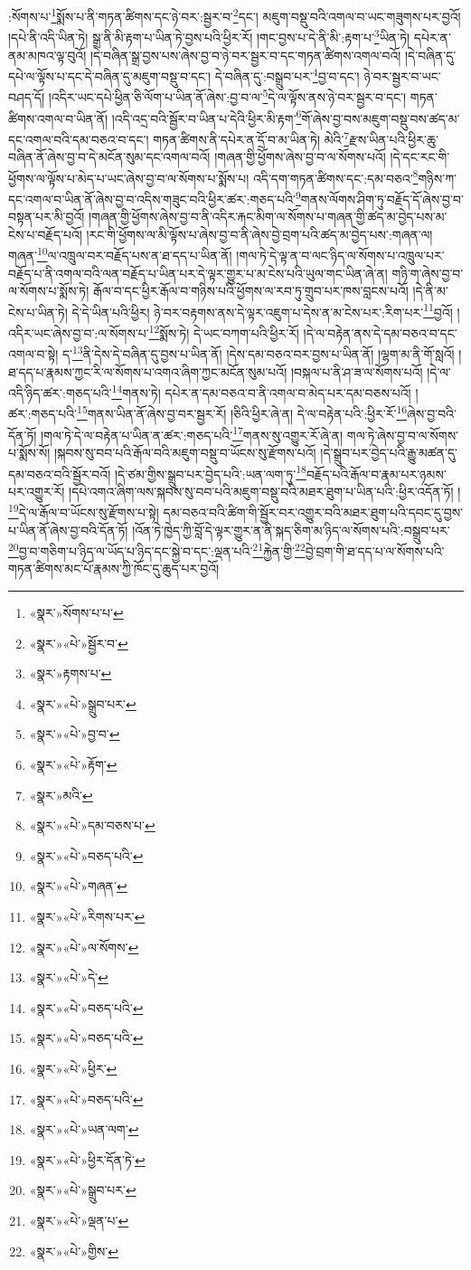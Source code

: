 :སོགས་པ་\footnote{«སྣར་»སོགས་པ་པ་}སྨོས་པ་ནི་གཏན་ཚིགས་དང་ཉེ་བར་:སྦྱར་བ་\footnote{«སྣར་»«པེ་»སྦྱོར་བ་}དང་། མཇུག་བསྡུ་བའི་འགལ་བ་ཡང་གཟུགས་པར་བྱའོ། །དཔེ་ནི་འདི་ཡིན་ཏེ། སྒྲ་ནི་མི་རྟག་པ་ཡིན་ཏེ་བྱས་པའི་ཕྱིར་རོ། །གང་བྱས་པ་དེ་ནི་མི་:རྟག་པ་\footnote{«སྣར་»རྟགས་པ་}ཡིན་ཏེ། དཔེར་ན་ནམ་མཁའ་ལྟ་བུའོ། །དེ་བཞིན་སྒྲ་བྱས་པས་ཞེས་བྱ་བ་ཉེ་བར་སྦྱར་བ་དང་གཏན་ཚིགས་འགལ་བའོ། །དེ་བཞིན་དུ་དཔེ་ལ་ལྟོས་པ་དང་དེ་བཞིན་དུ་མཇུག་བསྡུ་བ་དང་། དེ་བཞིན་དུ་:བསྒྲུབ་པར་\footnote{«སྣར་»«པེ་»སྒྲུབ་པར་}བྱ་བ་དང་། ཉེ་བར་སྦྱར་བ་ཡང་བཤད་དོ། །འདིར་ཡང་དཔེ་ཕྱིན་ཅི་ལོག་པ་ཡིན་ནོ་ཞེས་:བྱ་བ་ལ་\footnote{«སྣར་»«པེ་»བྱ་བ་}དེ་ལ་ལྟོས་ནས་ཉེ་བར་སྦྱར་བ་དང་། གཏན་ཚིགས་འགལ་བ་ཡིན་ནོ། །འདི་འདྲ་བའི་སྦྱོར་བ་ཡིན་པ་དེའི་ཕྱིར་མི་རྟག་\footnote{«སྣར་»«པེ་»རྟོག་}གོ་ཞེས་བྱ་བས་མཇུག་བསྡུ་བས་ཚད་མ་དང་འགལ་བའི་དམ་བཅའ་བ་དང་། གཏན་ཚིགས་ནི་དཔེར་ན་དྲོ་བ་མ་ཡིན་ཏེ། མེའི་\footnote{«སྣར་»མའི་}རྫས་ཡིན་པའི་ཕྱིར་ཆུ་བཞིན་ནོ་ཞེས་བྱ་བ་དེ་མངོན་སུམ་དང་འགལ་བའོ། །གཞན་གྱི་ཕྱོགས་ཞེས་བྱ་བ་ལ་སོགས་པའོ། །དེ་དང་རང་གི་ཕྱོགས་ལ་ལྟོས་པ་མེད་པ་ཡང་ཞེས་བྱ་བ་ལ་སོགས་པ་སྨོས་པ། འདི་དག་གཏན་ཚིགས་དང་:དམ་བཅའ་\footnote{«སྣར་»«པེ་»དམ་བཅས་པ་}གཉིས་ཀ་དང་འགལ་བ་ཡིན་ནོ་ཞེས་བྱ་བ་འདིས་གཟུང་བའི་ཕྱིར་ཚར་:གཅད་པའི་\footnote{«སྣར་»«པེ་»བཅད་པའི་}གནས་ལོགས་ཤིག་ཏུ་བརྗོད་དོ་ཞེས་བྱ་བ་བསྟན་པར་མི་བྱའོ། །གཞན་གྱི་ཕྱོགས་ཞེས་བྱ་བ་ནི་འདིར་རྐང་མིག་ལ་སོགས་པ་གཞན་གྱི་ཚད་མ་བྱེད་པས་མ་ངེས་པ་བརྗོད་པའོ། །རང་གི་ཕྱོགས་ལ་མི་ལྟོས་པ་ཞེས་བྱ་བ་ནི་ཞེས་བྱེ་བྲག་པའི་ཚད་མ་བྱེད་པས་:གཞན་ལ། གཞན་\footnote{«སྣར་»«པེ་»གཞན་}ལ་འཁྲུལ་བར་བརྗོད་པས་ན་ཐ་དད་པ་ཡིན་ནོ། །གལ་ཏེ་དེ་ལྟ་ན་བ་ལང་ཉིད་ལ་སོགས་པ་འཁྲུལ་པར་བརྗོད་པ་ནི་འགལ་བའི་ལན་བརྗོད་པ་ཡིན་པར་དེ་ལྟར་གྱུར་པ་མ་ངེས་པའི་ཡུལ་གང་ཡིན་ཞེ་ན། གཉི་ག་ཞེས་བྱ་བ་ལ་སོགས་པ་སྨོས་ཏེ། རྒོལ་བ་དང་ཕྱིར་རྒོལ་བ་གཉིས་པའི་ཕྱོགས་ལ་རབ་ཏུ་གྲུབ་པར་ཁས་བླངས་པའོ། །དེ་ནི་མ་ངེས་པ་ཡིན་ཏེ། དེ་དེ་ཡིན་པའི་ཕྱིར། ཉེ་བར་བརྟགས་ནས་དེ་ལྟར་འཇུག་པ་དེས་ན་མ་ངེས་པར་:རིག་པར་\footnote{«སྣར་»«པེ་»རིགས་པར་}བྱའོ། །འདིར་ཡང་ཞེས་བྱ་བ་:ལ་སོགས་པ་\footnote{«སྣར་»«པེ་»ལ་སོགས་}སྨོས་ཏེ། དེ་ཡང་བཀག་པའི་ཕྱིར་རོ། །དེ་ལ་བརྟེན་ནས་དེ་དམ་བཅའ་བ་དང་འགལ་བ་སྟེ། ད་\footnote{«སྣར་»«པེ་»དེ་}ནི་དེས་དེ་བཞིན་དུ་བྱས་པ་ཡིན་ནོ། །དེས་དམ་བཅའ་བར་བྱས་པ་ཡིན་ནོ། །ལྷག་མ་ནི་གོ་སླའོ། །ཐ་དད་པ་རྣམས་ཀྱང་རི་ལ་སོགས་པ་འགའ་ཞིག་ཀྱང་མངོན་སུམ་པའོ། །བསྐལ་པ་ནི་ཤ་ཟ་ལ་སོགས་པའོ། །དེ་ལ་འདི་ཉིད་ཚར་:གཅད་པའི་\footnote{«སྣར་»«པེ་»བཅད་པའི་}གནས་ཏེ། དཔེར་ན་དམ་བཅའ་བ་ནི་འགལ་བ་མེད་པར་དམ་བཅས་པའོ། །ཚར་:གཅད་པའི་\footnote{«སྣར་»«པེ་»བཅད་པའི་}གནས་ཡིན་ནོ་ཞེས་བྱ་བར་སྦྱར་རོ། །ཅིའི་ཕྱིར་ཞེ་ན། དེ་ལ་བརྟེན་པའི་:ཕྱིར་རོ་\footnote{«སྣར་»«པེ་»ཕྱིར་}ཞེས་བྱ་བའི་དོན་ཏོ། །གལ་ཏེ་དེ་ལ་བརྟེན་པ་ཡིན་ན་ཚར་:གཅད་པའི་\footnote{«སྣར་»«པེ་»བཅད་པའི་}གནས་སུ་འགྱུར་རོ་ཞེ་ན། གལ་ཏེ་ཞེས་བྱ་བ་ལ་སོགས་པ་སྨོས་སོ། །སྐབས་སུ་བབ་པའི་རྒོལ་བའི་མཇུག་བསྡུ་བ་ཡོངས་སུ་རྫོགས་པའོ། །དེ་སྒྲུབ་པར་བྱེད་པའི་རྒྱུ་མཚན་དུ་དམ་བཅའ་བའི་སྦྱོར་བའོ། །དེ་ཙམ་གྱིས་སྒྲུབ་པར་བྱེད་པའི་:ཡན་ལག་ཏུ་\footnote{«སྣར་»«པེ་»ཡན་ལག་}བརྗོད་པའི་རྒོལ་བ་རྣམ་པར་ཉམས་པར་འགྱུར་རོ། །དཔེ་འགའ་ཞིག་ལས་སྐབས་སུ་བབ་པའི་མཇུག་བསྡུ་བའི་མཐར་ཐུག་པ་ཡིན་པའི་:ཕྱིར་འདོན་ཏོ། །\footnote{«སྣར་»«པེ་»ཕྱིར་དོན་ཏེ་}དེ་ལ་རྒོལ་བ་ཡོངས་སུ་རྫོགས་པ་སྟེ། དམ་བཅའ་བའི་ཚིག་གི་སྦྱོར་བར་འགྱུར་བའི་མཐར་ཐུག་པའི་དབང་དུ་བྱས་པ་ཡིན་ནོ་ཞེས་བྱ་བའི་དོན་ཏོ། །འོན་ཏེ་ཁྱེད་ཀྱི་བློ་དེ་ལྟར་གྱུར་ན་ནི་སྐད་ཅིག་མ་ཉིད་ལ་སོགས་པའི་:བསྒྲུབ་པར་\footnote{«སྣར་»«པེ་»སྒྲུབ་པར་}བྱ་བ་གཅིག་པ་ཉིད་ལ་ཡོད་པ་ཉིད་དང་སྐྱེ་བ་དང་:ལྡན་པའི་\footnote{«སྣར་»«པེ་»ལྡན་པ་}རྐྱེན་གྱི་\footnote{«སྣར་»«པེ་»གྱིས་}བྱེ་བྲག་གི་ཐ་དད་པ་ལ་སོགས་པའི་གཏན་ཚིགས་མང་པོ་རྣམས་ཀྱི་ཁོང་དུ་ཆུད་པར་བྱའོ། 